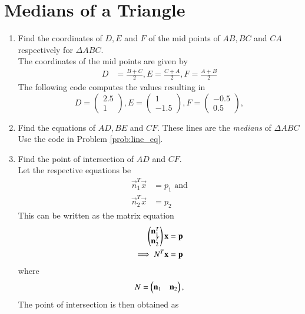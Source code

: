 \documentclass[journal,12pt,twocolumn]{IEEEtran}
\renewcommand\thesection{\arabic{section}}
\begin{document}
\section{Medians of a Triangle}
\begin{enumerate}[label=\thesection.\arabic*
,ref=\thesection.\theenumi]

\item
Find the coordinates of $D, E$ and $F$ of the mid points of $AB, BC$ and $CA$ respectively for  $\Delta ABC$. 
\\ 
\solution
The coordinates of the mid points are given by
%
\begin{align}
D &= \frac{B+C}{2}, E = \frac{C+A}{2}, F = \frac{A+B}{2}
\end{align}
%
The following code computes the values resulting in
\begin{equation}
D = \begin{pmatrix}
2.5
\\
1
\end{pmatrix},
E = \begin{pmatrix}
1
\\
-1.5
\end{pmatrix},
F = \begin{pmatrix}
-0.5
\\
0.5
\end{pmatrix},
\end{equation}

\item
Find the equations of $AD,BE$ and $CF$. These lines are the {\em medians} of $\Delta ABC$
\\
\solution Use the code in Problem \ref{prob:line_eq}. 
%
\item
\label{prob:median}
Find the point of intersection of $AD$ and $CF$.
\\
\solution
Let the respective equations  be
\begin{align}
\vec{n}_1^T\vec{x} &= p_1 \text{ and}
\\
\vec{n}_2^T\vec{x} &= p_2
\end{align}
This can be written as the matrix equation
\begin{align}
\begin{pmatrix} \mathbf{n}_1^T
\\
\mathbf{n}_2^T\end{pmatrix}
\mathbf{x}
&=
\mathbf{p}
\\
\implies N^T \mathbf{x}
&=
\mathbf{p}
\end{align}
%
where
\begin{equation}
N = \begin{pmatrix} \mathbf{n}_1 &
\mathbf{n}_2\end{pmatrix},
\end{equation}
%
The point of intersection is then obtained as

\end{enumerate}
\end{document}
